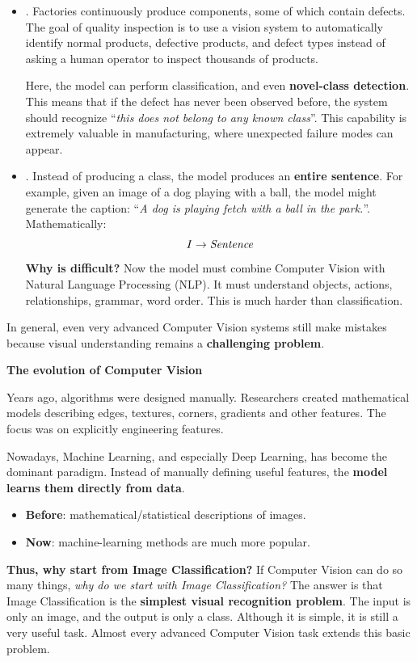 \begin{itemize}
    \item {}. Factories continuously produce components, some of which contain defects. The goal of quality inspection is to use a vision system to automatically identify normal products, defective products, and defect types instead of asking a human operator to inspect thousands of products.
    
    Here, the model can perform classification, and even \textbf{novel-class detection}. This means that if the defect has never been observed before, the system should recognize ``\emph{this does not belong to any known class}''. This capability is extremely valuable in manufacturing, where unexpected failure modes can appear.


    \item {}. Instead of producing a class, the model produces an \textbf{entire sentence}. For example, given an image of a dog playing with a ball, the model might generate the caption: ``\emph{A dog is playing fetch with a ball in the park.}''. Mathematically:
    \begin{equation*}
        I \to \emph{Sentence}
    \end{equation*}
    \textcolor{Red2}{ \textbf{Why is difficult?}} Now the model must combine Computer Vision with Natural Language Processing (NLP). It must understand objects, actions, relationships, grammar, word order. This is much harder than classification.
\end{itemize}
In general, even very advanced Computer Vision systems still make mistakes because visual understanding remains a \textbf{challenging problem}.

\highspace
\begin{flushleft}
    \textcolor{Green3}{ \textbf{The evolution of Computer Vision}}
\end{flushleft}
Years ago, algorithms were designed manually. Researchers created mathematical models describing edges, textures, corners, gradients and other features. The focus was on explicitly engineering features.

\highspace
Nowadays, Machine Learning, and especially Deep Learning, has become the dominant paradigm. Instead of manually defining useful features, the \textbf{model learns them directly from data}.
\begin{itemize}
    \item \textbf{Before}: mathematical/statistical descriptions of images.
    \item \textbf{Now}: machine-learning methods are much more popular.
\end{itemize}
\textcolor{Green3}{ \textbf{Thus, why start from Image Classification?}} If Computer Vision can do so many things, \emph{why do we start with Image Classification?} The answer is that Image Classification is the \textbf{simplest visual recognition problem}. The input is only an image, and the output is only a class. Although it is simple, it is still a very useful task. Almost every advanced Computer Vision task extends this basic problem.